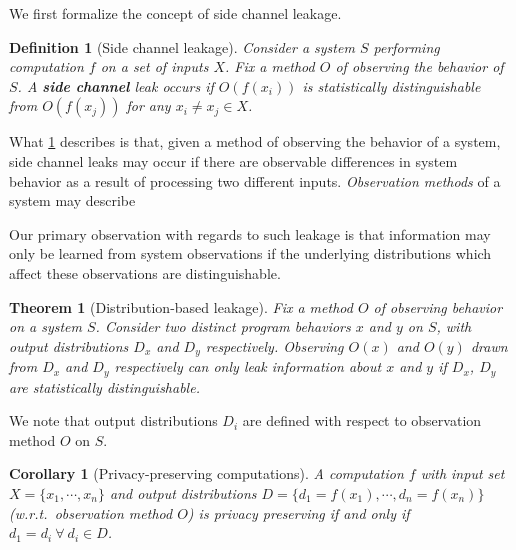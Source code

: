 \documentclass[a4paper]{article}
\theoremstyle{def}
\newtheorem{definition}{Definition}
\theoremstyle{thm}
\newtheorem{theorem}[proposition]{Theorem}
\newtheorem{corollary}{Corollary}[proposition]
\begin{document}
We first formalize the concept of side channel leakage.

\begin{definition}[Side channel leakage]\label{defn:side_channel}
    Consider a system $S$ performing computation $f$ on a set of inputs $X$.
    Fix a method $O$ of observing the behavior of $S$.
    A \textbf{side channel} leak occurs if $O(f(x_i))$ is \textit{statistically distinguishable} from $O(f(x_j))$ for any $x_i \neq x_j \in X$.
\end{definition}

What \ref{defn:side_channel} describes is that, given a method of observing the behavior of a system, side channel leaks may occur if there are observable differences in system behavior as a result of processing two different inputs.
\textit{Observation methods} of a system may describe

Our primary observation with regards to such leakage is that information may only be learned from system observations if the underlying distributions which affect these observations are distinguishable.

\begin{theorem}[Distribution-based leakage]\label{defn:dist_leakage}
    Fix a method $O$ of observing behavior on a system $S$.
    Consider two distinct program behaviors $x$ and $y$ on $S$, with output distributions $D_x$ and $D_y$ respectively.
    Observing $O(x)$ and $O(y)$ drawn from $D_x$ and $D_y$ respectively can only leak information about $x$ and $y$ if $D_x$, $D_y$ are statistically distinguishable.
\end{theorem}

We note that output distributions $D_i$ are defined with respect to observation method $O$ on $S$. 

\begin{corollary}[Privacy-preserving computations]
    A computation $f$ with input set $X = \{x_1, \cdots, x_n \}$ and output distributions $D = \{d_1 = f(x_1), \cdots, d_n = f(x_n)\}$ (w.r.t.\ observation method $O$) is privacy preserving if and only if $d_1 = d_i~\forall~d_i \in D$.
\end{corollary}



\end{document}
